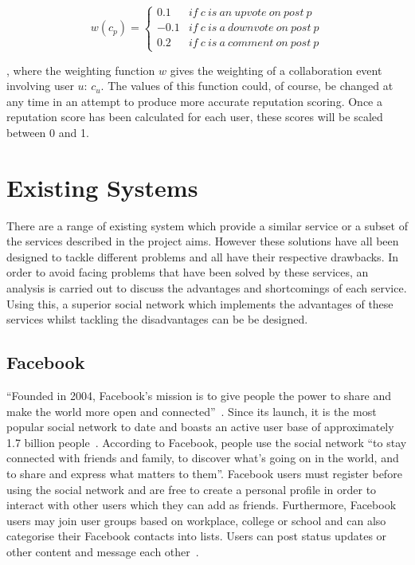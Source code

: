 \begin{equation}
	\label{eq:rep_weight_post}
	 w(c_p) = \left\{\begin{matrix}
			0.1 & if\ c\ is\ an\ upvote\ on\ post\ p \\ 
			-0.1 & if\ c\ is\ a\ downvote\ on\ post\ p \\ 
			0.2 & if\ c\ is\ a\ comment\ on\ post\ p
	\end{matrix}\right.
\end{equation}

\noindent
, where the weighting function \(w\) gives the weighting of a collaboration event involving user \(u\): \(c_u\). The values of this function could, of course, be changed at any time in an attempt to produce more accurate reputation scoring. Once a reputation score has been calculated for each user, these scores will be scaled between 0 and 1.

\section{Existing Systems}
There are a range of existing system which provide a similar service or a subset of the services described in the project aims. However these solutions have all been designed to tackle different problems and all have their respective drawbacks. In order to avoid facing problems that have been solved by these services, an analysis is carried out to discuss the advantages and shortcomings of each service. Using this, a superior social network which implements the advantages of these services whilst tackling the disadvantages can be be designed.

\subsection{Facebook}
``Founded in 2004, Facebook's mission is to give people the power to share and make the world more open and connected''~\cite{Facebook:About}. Since its launch, it is the most popular social network to date and boasts an active user base of approximately 1.7 billion people~\cite{Statista:Facebook}. According to Facebook, people use the social network ``to stay connected with friends and family, to discover what's going on in the world, and to share and express what matters to them''. Facebook users must register before using the social network and are free to create a personal profile in order to interact with other users which they can add as friends. Furthermore, Facebook users may join user groups based on workplace, college or school and can also categorise their Facebook contacts into lists. Users can post status updates or other content and message each other~\cite{Statista:Facebook}. 

